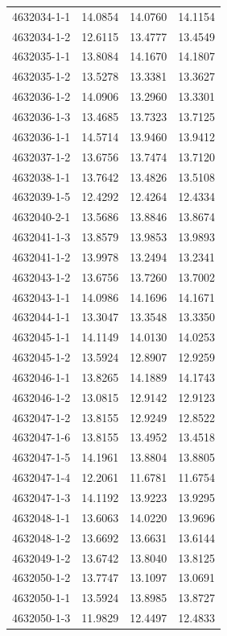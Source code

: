\begin{longtable}{lrrr}
4632034-1-1 & 14.0854 & 14.0760 & 14.1154 \\
4632034-1-2 & 12.6115 & 13.4777 & 13.4549 \\
4632035-1-1 & 13.8084 & 14.1670 & 14.1807 \\
4632035-1-2 & 13.5278 & 13.3381 & 13.3627 \\
4632036-1-2 & 14.0906 & 13.2960 & 13.3301 \\
4632036-1-3 & 13.4685 & 13.7323 & 13.7125 \\
4632036-1-1 & 14.5714 & 13.9460 & 13.9412 \\
4632037-1-2 & 13.6756 & 13.7474 & 13.7120 \\
4632038-1-1 & 13.7642 & 13.4826 & 13.5108 \\
4632039-1-5 & 12.4292 & 12.4264 & 12.4334 \\
4632040-2-1 & 13.5686 & 13.8846 & 13.8674 \\
4632041-1-3 & 13.8579 & 13.9853 & 13.9893 \\
4632041-1-2 & 13.9978 & 13.2494 & 13.2341 \\
4632043-1-2 & 13.6756 & 13.7260 & 13.7002 \\
4632043-1-1 & 14.0986 & 14.1696 & 14.1671 \\
4632044-1-1 & 13.3047 & 13.3548 & 13.3350 \\
4632045-1-1 & 14.1149 & 14.0130 & 14.0253 \\
4632045-1-2 & 13.5924 & 12.8907 & 12.9259 \\
4632046-1-1 & 13.8265 & 14.1889 & 14.1743 \\
4632046-1-2 & 13.0815 & 12.9142 & 12.9123 \\
4632047-1-2 & 13.8155 & 12.9249 & 12.8522 \\
4632047-1-6 & 13.8155 & 13.4952 & 13.4518 \\
4632047-1-5 & 14.1961 & 13.8804 & 13.8805 \\
4632047-1-4 & 12.2061 & 11.6781 & 11.6754 \\
4632047-1-3 & 14.1192 & 13.9223 & 13.9295 \\
4632048-1-1 & 13.6063 & 14.0220 & 13.9696 \\
4632048-1-2 & 13.6692 & 13.6631 & 13.6144 \\
4632049-1-2 & 13.6742 & 13.8040 & 13.8125 \\
4632050-1-2 & 13.7747 & 13.1097 & 13.0691 \\
4632050-1-1 & 13.5924 & 13.8985 & 13.8727 \\
4632050-1-3 & 11.9829 & 12.4497 & 12.4833 \\

\end{longtable}
